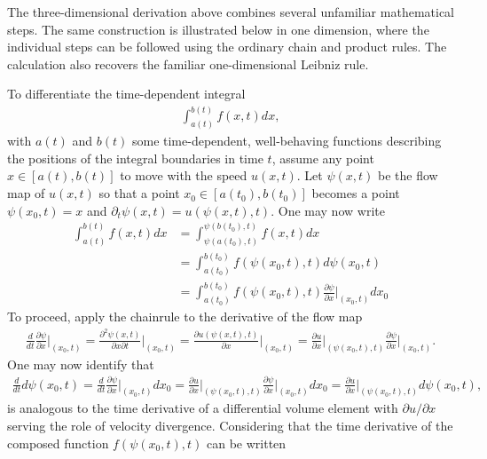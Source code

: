 \begin{example}
    The three-dimensional derivation above combines several unfamiliar mathematical steps. The same construction is illustrated below in one dimension, where the individual steps can be followed using the ordinary chain and product rules. The calculation also recovers the familiar one-dimensional Leibniz rule.

    To differentiate the time-dependent integral
    \begin{align*}
        \int_{a(t)}^{b(t)} f(x,t) dx,
    \end{align*}
    with $a(t)$ and $b(t)$ some time-dependent, well-behaving functions describing the positions of the integral boundaries in time $t$, assume any point $x\in[a(t),b(t)]$ to move with the speed $u(x,t)$. Let $\psi(x,t)$ be the flow map of $u(x,t)$ so that a point $x_0\in[a(t_0),b(t_0)]$ becomes a point $\psi(x_0,t)=x$ and $\partial_t\psi(x,t)=u(\psi(x,t),t)$. One may now write
    \begin{align*}
        \int_{a(t)}^{b(t)} f(x,t) dx&=\int_{\psi(a(t_0),t)}^{\psi(b(t_0),t)}f(x,t)dx\\
        &=\int_{a(t_0)}^{b(t_0)}f(\psi(x_0,t),t)d\psi(x_0,t)\\
        &=\int_{a(t_0)}^{b(t_0)}f(\psi(x_0,t),t)\frac{\partial\psi}{\partial x}\Big|_{(x_0,t)}dx_0
    \end{align*}
    To proceed, apply the chainrule to the derivative of the flow map
    \begin{align*}
        \frac{d}{dt}\frac{\partial\psi}{\partial x}\Big|_{(x_0,t)}=\frac{\partial^2\psi(x,t)}{\partial x\partial t}\Big|_{(x_0,t)}=\frac{\partial u(\psi(x,t),t)}{\partial x}\Big|_{(x_0,t)}=\frac{\partial u}{\partial x}\Big|_{(\psi(x_0,t),t)}\frac{\partial\psi}{\partial x}\Big|_{(x_0,t)}.
    \end{align*}
    One may now identify that 
    \begin{align*}
        \frac{d}{dt}d\psi(x_0,t)=\frac{d}{dt}\frac{\partial\psi}{\partial x}\Big|_{(x_0,t)}dx_0=\frac{\partial u}{\partial x}\Big|_{(\psi(x_0,t),t)}\frac{\partial\psi}{\partial x}\Big|_{(x_0,t)}dx_0=\frac{\partial u}{\partial x}\Big|_{(\psi(x_0,t),t)}d\psi(x_0,t),
    \end{align*}
    is analogous to the time derivative of a differential volume element with $\partial u/\partial x$ serving the role of velocity divergence. Considering that the time derivative of the composed function $f(\psi(x_0,t),t)$ can be written 
    \begin{align*}

\end{align*}
\end{example}
